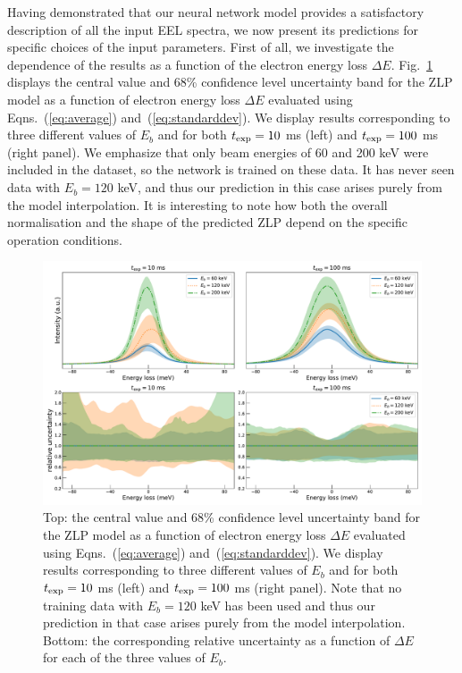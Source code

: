 Having demonstrated that our neural network model provides a satisfactory description
of all the input EEL spectra, we now present its predictions for specific
choices of the input parameters.
%
First of all, we investigate the dependence of the results as a function of the
electron energy loss $\Delta E$.
%
Fig.~\ref{fig:EELS_vacuum_DeltaE} displays the central value and 68\% confidence level uncertainty band
for the ZLP model as a function
of electron energy loss $\Delta E$
evaluated using Eqns.~(\ref{eq:average}) and~(\ref{eq:standarddev}).
%
We display results corresponding to 
three different values of $E_b$ and for both
$t_{\rm exp}=10$ ms (left)  and $t_{\rm exp}=100$ ms (right panel).
%
We emphasize that only beam energies of 60 and 200 keV were included in the dataset,
so the network is trained on these data.
%
It has never seen data with $E_b=120$ keV, and thus our prediction
in this case arises purely from the model interpolation.
%
It is interesting to note how both the overall normalisation and the shape of
the predicted ZLP depend on the specific operation conditions.

\begin{figure}[H]
    \centering
    \includegraphics[width=150mm]{plots/deltaE_dependence_vacuum.pdf}
    \caption{Top: the central value and 68\% confidence level uncertainty band
      for the ZLP model as a function
      of electron energy loss $\Delta E$
      evaluated using Eqns.~(\ref{eq:average}) and~(\ref{eq:standarddev}).
      We display results corresponding to 
      three different values of $E_b$  and for both
      $t_{\rm exp}=10$ ms (left)  and $t_{\rm exp}=100$ ms (right panel).
      Note that no training data with $E_b=120$ keV has been used and thus our prediction
      in that case arises purely from the model interpolation.
      Bottom: the corresponding relative uncertainty as a function of $\Delta E$
      for each of the three values of $E_b$.
      }
      \label{fig:EELS_vacuum_DeltaE}
\end{figure}

